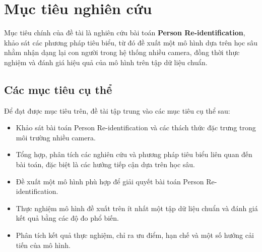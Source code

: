 \section{Mục tiêu nghiên cứu}
Mục tiêu chính của đề tài là nghiên cứu bài toán \textbf{Person Re-identification}, khảo sát các phương pháp tiêu biểu, từ đó đề xuất một mô hình dựa trên học sâu nhằm nhận dạng lại con người trong hệ thống nhiều camera, đồng thời thực nghiệm và đánh giá hiệu quả của mô hình trên tập dữ liệu chuẩn.

\subsection*{Các mục tiêu cụ thể}
Để đạt được mục tiêu trên, đề tài tập trung vào các mục tiêu cụ thể sau:
\begin{itemize}
    \item Khảo sát bài toán Person Re-identification và các thách thức đặc trưng trong môi trường nhiều camera.
    \item Tổng hợp, phân tích các nghiên cứu và phương pháp tiêu biểu liên quan đến bài toán, đặc biệt là các hướng tiếp cận dựa trên học sâu.
    \item Đề xuất một mô hình phù hợp để giải quyết bài toán Person Re-identification.
    \item Thực nghiệm mô hình đề xuất trên ít nhất một tập dữ liệu chuẩn và đánh giá kết quả bằng các độ đo phổ biến.
    \item Phân tích kết quả thực nghiệm, chỉ ra ưu điểm, hạn chế và một số hướng cải tiến của mô hình.
\end{itemize}
